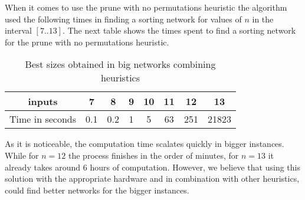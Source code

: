 \documentclass[../main.tex]{subfiles}
\begin{document}
	When it comes to use the prune with no permutations heuristic the algorithm used the following times in finding a sorting network for values of $n$ in the interval $[7..13]$. The next table shows the times spent to find a sorting network for the prune with no permutations heuristic.
	
	\begin{table}[H]
		\begin{center}
			\begin{tabular}{|c | c c c c c c c|} 
				\hline
				inputs & 7 & 8 & 9 & 10 & 11 & 12 & 13  \\ [0.5ex] 
				\hline
				Time in seconds & 0.1 & 0.2 & 1 & 5 & 63 & 251 & 21823 \\ [1ex]
				\hline
			\end{tabular}
		\end{center}	
		\caption{Best sizes obtained in big networks combining heuristics}
		\label{table:timeHeuristics}
	\end{table}
	
	 As it is noticeable, the computation time scalates quickly in bigger instances. While for $n=12$ the process finishes in the order of minutes, for $n=13$ it already takes around 6 hours of computation. However, we believe that using this solution with the appropriate hardware and in combination with other heuristics, could find better networks for the bigger instances.

	\newpage
\end{document}
